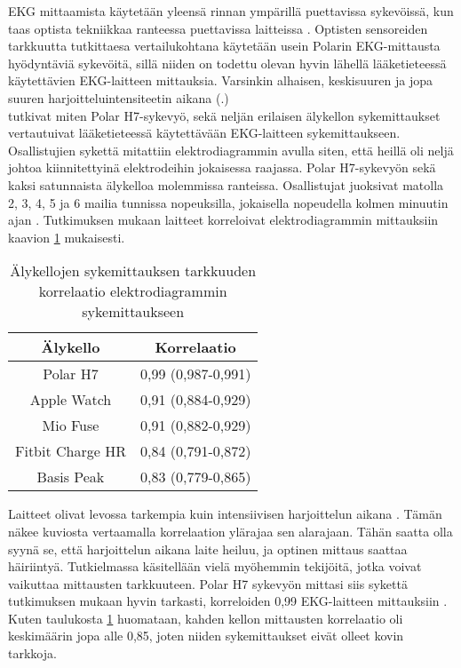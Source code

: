 \documentclass[utf8,bachelor,finnish]{bachelor}
\begin{document}
      
  EKG mittaamista käytetään yleensä rinnan ympärillä puettavissa sykevöissä, kun taas optista tekniikkaa ranteessa puettavissa laitteissa \parencite{noauthor_heart_nodate}.
   Optisten sensoreiden tarkkuutta tutkittaesa vertailukohtana käytetään usein Polarin EKG-mittausta hyödyntäviä sykevöitä, sillä niiden on todettu olevan hyvin lähellä
    lääketieteessä käytettävien EKG-laitteen mittauksia. Varsinkin alhaisen, keskisuuren ja jopa suuren harjoitteluintensiteetin aikana
     (\cite{gilgen-ammann_rr_2019, nelson_accuracy_2019}.) \\


   \textcite{wang_accuracy_2017} tutkivat miten Polar H7-sykevyö, sekä neljän erilaisen älykellon sykemittaukset vertautuivat lääketieteessä käytettävään
    EKG-laitteen sykemittaukseen. Osallistujien sykettä mitattiin elektrodiagrammin avulla siten,
     että heillä oli neljä johtoa kiinnitettyinä elektrodeihin jokaisessa raajassa. Polar H7-sykevyön sekä kaksi satunnaista älykelloa molemmissa ranteissa.
      Osallistujat juoksivat matolla 2, 3, 4, 5 ja 6 mailia tunnissa nopeuksilla, jokaisella nopeudella kolmen minuutin ajan \parencite{wang_accuracy_2017}.
       Tutkimuksen mukaan laitteet korreloivat elektrodiagrammin mittauksiin kaavion \ref{table:wang} mukaisesti.\\


  \begin{table}[H]
    \begin{center}
      \begin{tabular}{||c c||} 
       \hline
       Älykello & Korrelaatio\\
       \hline\hline
       Polar H7 & 0,99 (0,987-0,991)\\
       \hline
      Apple Watch & 0,91 (0,884-0,929)\\
      \hline
      Mio Fuse & 0,91 (0,882-0,929)\\
      \hline
      Fitbit Charge HR & 0,84 (0,791-0,872)\\
      \hline
      Basis Peak & 0,83 (0,779-0,865)\\[0.5ex]
      \hline
      \end{tabular}
    \caption{Älykellojen sykemittauksen tarkkuuden korrelaatio elektrodiagrammin sykemittaukseen \parencite{wang_accuracy_2017}}
    \label{table:wang}
      \end{center}
    \end{table}

  Laitteet olivat levossa tarkempia kuin intensiivisen harjoittelun aikana \parencite{wang_accuracy_2017}. Tämän näkee kuviosta vertaamalla korrelaation ylärajaa sen alarajaan.
   Tähän saatta olla syynä se, että harjoittelun aikana laite heiluu, ja optinen mittaus saattaa häiriintyä. Tutkielmassa käsitellään vielä myöhemmin tekijöitä, jotka voivat vaikuttaa mittausten tarkkuuteen. 
    Polar H7 sykevyön mittasi siis sykettä tutkimuksen mukaan hyvin tarkasti, korreloiden 0,99 EKG-laitteen mittauksiin \parencite{wang_accuracy_2017}.
     Kuten taulukosta \ref{table:wang} huomataan, kahden kellon mittausten korrelaatio oli keskimäärin jopa alle 0,85, joten niiden sykemittaukset eivät olleet kovin tarkkoja.\\
  
\end{document}
